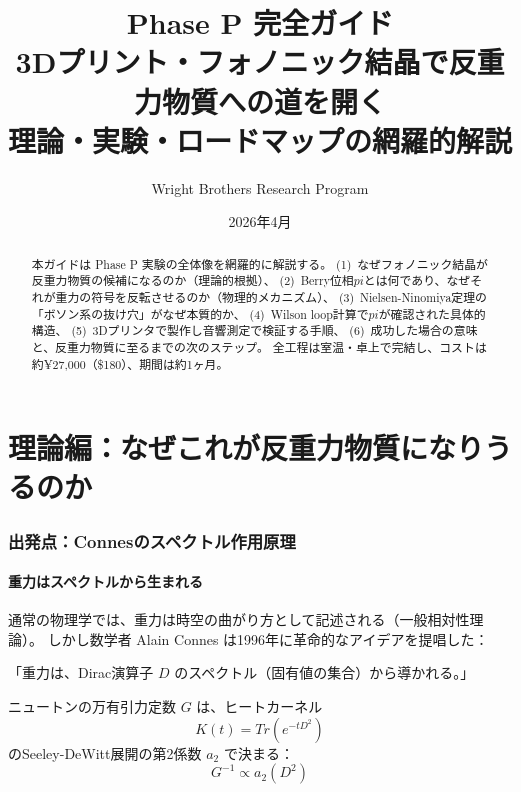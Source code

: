 \documentclass[11pt,a4paper]{article}
\title{Phase P 完全ガイド\\[6pt]
\large 3Dプリント・フォノニック結晶で反重力物質への道を開く\\[4pt]
\normalsize 理論・実験・ロードマップの網羅的解説}
\author{Wright Brothers Research Program}
\date{2026年4月}
\def\pi{pi}%
\def\mathrm#1{#1}%
\def\textbf#1{#1}%
\begin{document}
\maketitle

\begin{abstract}
本ガイドは Phase P 実験の\textbf{全体像}を網羅的に解説する。
(1)~なぜフォノニック結晶が反重力物質の候補になるのか（理論的根拠）、
(2)~Berry位相$\pi$とは何であり、なぜそれが重力の符号を反転させるのか（物理的メカニズム）、
(3)~Nielsen-Ninomiya定理の「ボソン系の抜け穴」がなぜ本質的か、
(4)~Wilson loop計算で$\pi$が確認された具体的構造、
(5)~3Dプリンタで製作し音響測定で検証する手順、
(6)~成功した場合の意味と、反重力物質に至るまでの次のステップ。
全工程は室温・卓上で完結し、コストは約¥27,000（\$180）、期間は約1ヶ月。
\end{abstract}

\tableofcontents
\newpage

\part{理論編：なぜこれが反重力物質になりうるのか}

\section{出発点：Connesのスペクトル作用原理}

\subsection{重力はスペクトルから生まれる}

通常の物理学では、重力は時空の曲がり方として記述される（一般相対性理論）。
しかし数学者 Alain Connes は1996年に革命的なアイデアを提唱した：

\begin{tcolorbox}[colback=blue!5,colframe=blue!60!black,title=スペクトル作用原理]
\textbf{「重力は、Dirac演算子 $D$ のスペクトル（固有値の集合）から導かれる。」}

ニュートンの万有引力定数 $G$ は、ヒートカーネル
\begin{equation}
  K(t) = \mathrm{Tr}(e^{-tD^2})
\end{equation}
のSeeley-DeWitt展開の第2係数 $a_2$ で決まる：
\begin{equation}
  G^{-1} \propto a_2(D^2)
\end{equation}
\end{tcolorbox}
\end{document}
